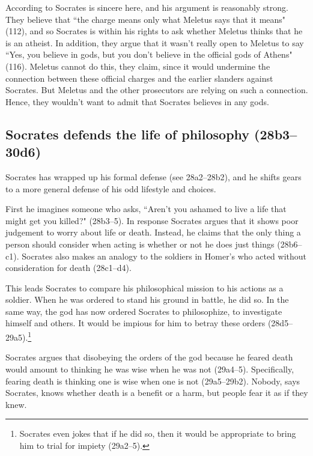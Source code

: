 \documentclass[11pt]{article}
\begin{document}
According to \citeauthor{brickhouse2004} Socrates is sincere here, and his
argument is reasonably strong.  They believe that ``the charge means only
what Meletus says that it means" (112), and so Socrates is within his
rights to ask whether Meletus thinks that he is an atheist.  In addition,
they argue that it wasn't really open to Meletus to say ``Yes, you believe
in gods, but you don't believe in the official gods of Athens" (116).
Meletus cannot do this, they claim, since it would undermine the connection
between these official charges and the earlier slanders against Socrates.
But Meletus and the other prosecutors are relying on such a connection.
Hence, they wouldn't want to admit that Socrates believes in any gods.



\subsection{Socrates defends the life of philosophy (28b3--30d6)}

Socrates has wrapped up his formal defense (see 28a2--28b2), and he shifts
gears to a more general defense of his odd lifestyle and choices.

First he imagines someone who asks, ``Aren't you ashamed to live a life
that might get you killed?" (28b3--5).  In response Socrates argues that it
shows poor judgement to worry about life or death. Instead, he claims that
the only thing a person should consider when acting is whether or not he
does just things (28b6--c1).  Socrates also makes an analogy to the
soldiers in Homer's  who acted without consideration for death
(28c1--d4).

This leads Socrates to compare his philosophical mission to his actions as
a soldier.  When he was ordered to stand his ground in battle, he did so.
In the same way, the god has now ordered Socrates to philosophize, to
investigate himself and others.  It would be impious for him to betray
these orders (28d5--29a5).\footnote{Socrates even jokes that if he did so,
then it would be appropriate to bring him to trial for impiety (29a2--5).}

Socrates argues that disobeying the orders of the god because he feared
death would amount to thinking he was wise when he was not (29a4--5).
Specifically, fearing death is thinking one is wise when one is not
(29a5--29b2).  Nobody, says Socrates, knows whether death is a benefit or
a harm, but people fear it as if they knew.
\end{document}
